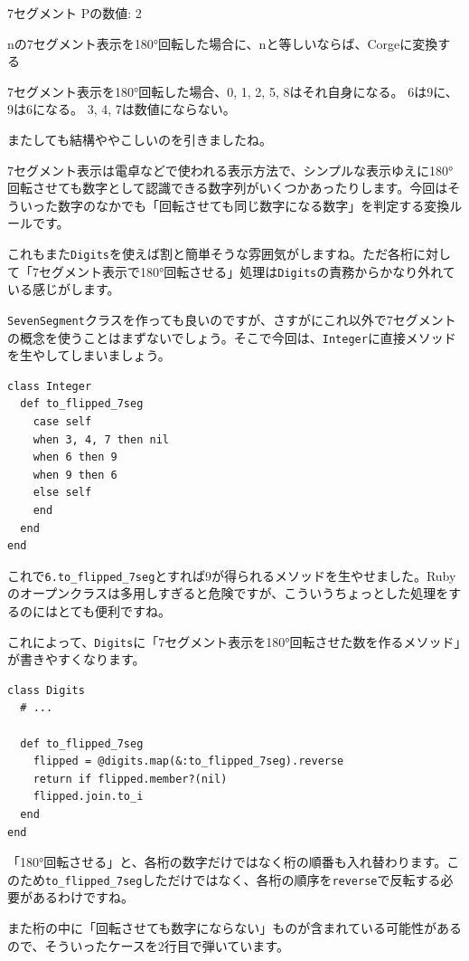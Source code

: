 \documentclass[index]{subfiles}
\begin{document}
\begin{itembox}[l]{7セグメント}
Pの数値: 2

nの7セグメント表示を180°回転した場合に、nと等しいならば、Corgeに変換する

7セグメント表示を180°回転した場合、0, 1, 2, 5, 8はそれ自身になる。
6は9に、9は6になる。
3, 4, 7は数値にならない。
\end{itembox}

またしても結構ややこしいのを引きましたね。

7セグメント表示は電卓などで使われる表示方法で、シンプルな表示ゆえに180°回転させても数字として認識できる数字列がいくつかあったりします。今回はそういった数字のなかでも「回転させても同じ数字になる数字」を判定する変換ルールです。

これもまた\verb+Digits+を使えば割と簡単そうな雰囲気がしますね。ただ各桁に対して「7セグメント表示で180°回転させる」処理は\verb+Digits+の責務からかなり外れている感じがします。

\verb+SevenSegment+クラスを作っても良いのですが、さすがにこれ以外で7セグメントの概念を使うことはまずないでしょう。そこで今回は、\verb+Integer+に直接メソッドを生やしてしまいましょう。

\begin{lstlisting}
class Integer
  def to_flipped_7seg
    case self
    when 3, 4, 7 then nil
    when 6 then 9
    when 9 then 6
    else self
    end
  end
end
\end{lstlisting}

これで\verb+6.to_flipped_7seg+とすれば9が得られるメソッドを生やせました。Rubyのオープンクラスは多用しすぎると危険ですが、こういうちょっとした処理をするのにはとても便利ですね。

これによって、\verb+Digits+に「7セグメント表示を180°回転させた数を作るメソッド」が書きやすくなります。

\begin{lstlisting}
class Digits
  # ...
  
  def to_flipped_7seg
    flipped = @digits.map(&:to_flipped_7seg).reverse
    return if flipped.member?(nil)
    flipped.join.to_i
  end
end
\end{lstlisting}

「180°回転させる」と、各桁の数字だけではなく桁の順番も入れ替わります。このため\verb+to_flipped_7seg+しただけではなく、各桁の順序を\verb+reverse+で反転する必要があるわけですね。

また桁の中に「回転させても数字にならない」ものが含まれている可能性があるので、そういったケースを2行目で弾いています。
\end{document}
